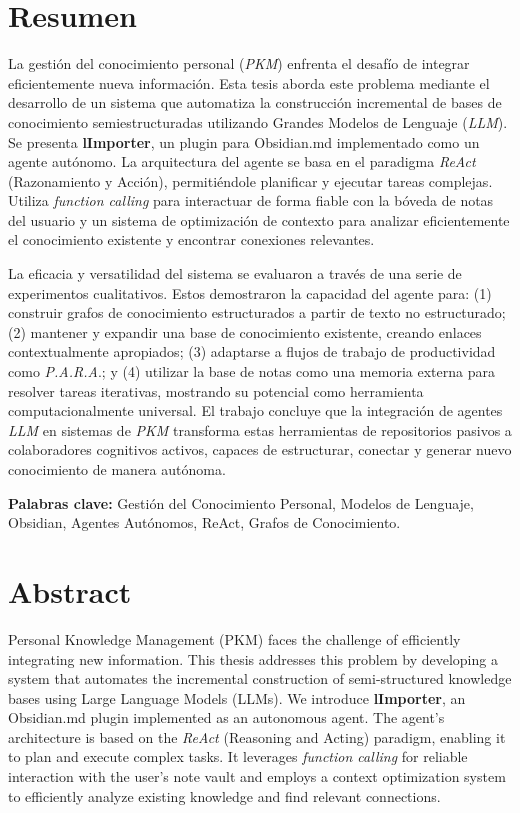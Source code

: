 \chapter*{Resumen}

La gestión del conocimiento personal (\textit{PKM}) enfrenta el desafío de integrar eficientemente nueva información. Esta tesis aborda este problema mediante el desarrollo de un sistema que automatiza la construcción incremental de bases de conocimiento semiestructuradas utilizando Grandes Modelos de Lenguaje (\textit{LLM}). Se presenta \textbf{lImporter}, un plugin para Obsidian.md implementado como un agente autónomo. La arquitectura del agente se basa en el paradigma \textit{ReAct} (Razonamiento y Acción), permitiéndole planificar y ejecutar tareas complejas. Utiliza \textit{function calling} para interactuar de forma fiable con la bóveda de notas del usuario y un sistema de optimización de contexto para analizar eficientemente el conocimiento existente y encontrar conexiones relevantes.

La eficacia y versatilidad del sistema se evaluaron a través de una serie de experimentos cualitativos. Estos demostraron la capacidad del agente para: (1) construir grafos de conocimiento estructurados a partir de texto no estructurado; (2) mantener y expandir una base de conocimiento existente, creando enlaces contextualmente apropiados; (3) adaptarse a flujos de trabajo de productividad como \textit{P.A.R.A}.; y (4) utilizar la base de notas como una memoria externa para resolver tareas iterativas, mostrando su potencial como herramienta computacionalmente universal. El trabajo concluye que la integración de agentes \textit{LLM} en sistemas de \textit{PKM} transforma estas herramientas de repositorios pasivos a colaboradores cognitivos activos, capaces de estructurar, conectar y generar nuevo conocimiento de manera autónoma.

\vspace{1cm}
\textbf{Palabras clave:} Gestión del Conocimiento Personal, Modelos de Lenguaje, Obsidian, Agentes Autónomos, ReAct, Grafos de Conocimiento.

\chapter*{Abstract}

Personal Knowledge Management (PKM) faces the challenge of efficiently integrating new information. This thesis addresses this problem by developing a system that automates the incremental construction of semi-structured knowledge bases using Large Language Models (LLMs). We introduce \textbf{lImporter}, an Obsidian.md plugin implemented as an autonomous agent. The agent's architecture is based on the \textit{ReAct} (Reasoning and Acting) paradigm, enabling it to plan and execute complex tasks. It leverages \textit{function calling} for reliable interaction with the user's note vault and employs a context optimization system to efficiently analyze existing knowledge and find relevant connections.

